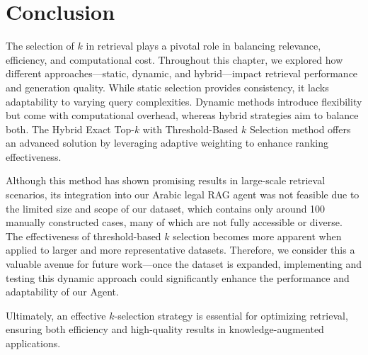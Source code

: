 \section{Conclusion}

The selection of $k$ in retrieval plays a pivotal role in balancing relevance, efficiency, and computational cost. Throughout this chapter, we explored how different approaches—static, dynamic, and hybrid—impact retrieval performance and generation quality. While static selection provides consistency, it lacks adaptability to varying query complexities. Dynamic methods introduce flexibility but come with computational overhead, whereas hybrid strategies aim to balance both. The Hybrid Exact Top-$k$ with Threshold-Based $k$ Selection method offers an advanced solution by leveraging adaptive weighting to enhance ranking effectiveness.

Although this method has shown promising results in large-scale retrieval scenarios, its integration into our Arabic legal RAG agent was not feasible due to the limited size and scope of our dataset, which contains only around 100 manually constructed cases, many of which are not fully accessible or diverse. The effectiveness of threshold-based $k$ selection becomes more apparent when applied to larger and more representative datasets. Therefore, we consider this a valuable avenue for future work—once the dataset is expanded, implementing and testing this dynamic approach could significantly enhance the performance and adaptability of our Agent.

Ultimately, an effective $k$-selection strategy is essential for optimizing retrieval, ensuring both efficiency and high-quality results in knowledge-augmented applications.
